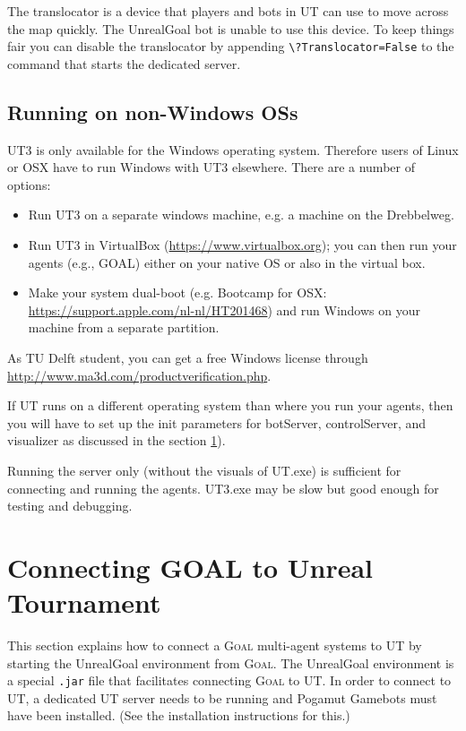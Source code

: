 \documentclass[11pt,a4paper]{article}
\newcommand{\Goal}{\textsc{Goal}}
\begin{document}
The translocator is a device that players and bots in UT can use to move across the map quickly. The UnrealGoal bot is unable to use this device. To keep things fair you can disable the translocator by appending \verb|\?Translocator=False| to the command that starts the dedicated server.

\subsection{Running on non-Windows OSs}
UT3 is only available for the Windows operating system. Therefore users of Linux or OSX have to run Windows with UT3 elsewhere. There are a number of options:

\begin{itemize}
\item Run UT3 on a separate windows machine, e.g. a machine on the Drebbelweg. 
\item Run UT3 in VirtualBox (\url{https://www.virtualbox.org}); you can then run your agents (e.g., GOAL) either on your native OS or also in the virtual box.
\item Make your system dual-boot (e.g.  Bootcamp for OSX: \url{https://support.apple.com/nl-nl/HT201468}) and run Windows on your machine from a separate partition.
\end{itemize}

As TU Delft student, you can get a free Windows license through \url{http://www.ma3d.com/productverification.php}.

If UT runs on a different operating system than where you run your agents, then you will have to set up the init parameters for botServer, controlServer, and visualizer as discussed in the section \ref{sec:masspec}).

Running the server only (without the visuals of UT.exe) is sufficient for connecting and running the agents. UT3.exe may be slow but good enough for testing and debugging.

%
%
%
\section{Connecting GOAL to Unreal Tournament}\label{sec:masspec}
%

This section explains how to connect a {\Goal} multi-agent systems to UT by starting the UnrealGoal environment from {\Goal}. The UnrealGoal environment is a special \texttt{.jar} file that facilitates connecting {\Goal} to UT. In order to connect to UT, a dedicated UT server needs to be running and Pogamut Gamebots must have been installed. (See the installation instructions for this.) %
\end{document}
